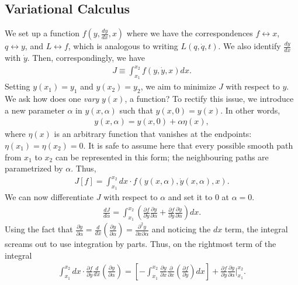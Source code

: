 \subsection{Variational Calculus}

We set up a function $f(y,\frac{dy}{dx},x)$ where we have the correspondences $f \leftrightarrow x$, $q \leftrightarrow y$, and $L \leftrightarrow f$, which is analogous to writing $L(q,\dot{q},t)$. We also identify $\frac{dy}{dx}$ with $\dot{y}$. Then, correspondingly, we have
\begin{align}
    J \equiv \int_{x_{1}}^{x_{2}} f(y,\dot{y},x)dx.
\end{align}
Setting $y(x_{1}) = y_{1}$ and $y(x_{2}) = y_{2}$, we aim to minimize $J$ with respect to $y$. We ask how does one \textit{vary} $y(x)$, a function? To rectify this issue, we introduce a new parameter $\alpha$ in $y(x,\alpha)$ such that $y(x,0) = y(x)$. In other words,
\begin{align}
    y(x,\alpha) = y(x,0) + \alpha \eta(x),
\end{align}
where $\eta(x)$ is an arbitrary function that vanishes at the endpoints: $\eta(x_{1}) = \eta(x_{2}) = 0$. It is safe to assume here that every possible smooth path from $x_{1}$ to $x_{2}$ can be represented in this form; the neighbouring paths are parametrized by $\alpha$. Thus,
\begin{align}
    J[f] = \int_{x_{1}}^{x_{2}}dx \cdot f(y(x,\alpha),\dot{y}(x,\alpha),x).
\end{align}
We can now differentiate $J$ with respect to $\alpha$ and set it to $0$ at $\alpha = 0$.
\begin{align}
    \frac{dJ}{d\alpha} = \int_{x_{1}}^{x_{2}} \left( \frac{\partial f}{\partial y} \frac{\partial y}{\partial \alpha} + \frac{\partial f}{\partial \dot{y}} \frac{\partial \dot{y}}{\partial \alpha} \right) dx.
\end{align}
Using the fact that $\frac{\partial \dot{y}}{\partial \alpha} = \frac{d}{dx} \left( \frac{\partial y}{\partial \alpha} \right) = \frac{\partial^{2} y}{\partial x \partial \alpha}$ and noticing the $dx$ term, the integral screams out to use integration by parts. Thus, on the rightmost term of the integral
\begin{align}
    \int_{x_{1}}^{x_{2}} dx \cdot \frac{\partial f}{\partial \dot{y}} \frac{d}{dx} \left( \frac{\partial y}{\partial \alpha}\right) = \left[-\int_{x_{1}}^{x_{2}} \frac{\partial y}{\partial x} \frac{\partial}{\partial x} \left( \frac{\partial f}{\partial \dot{y}} \right) dx \right] + \frac{\partial f}{\partial \dot{y}} \frac{\partial y}{\partial \alpha} \bigg|_{x_{1}}^{x_{2}}.
\end{align}
